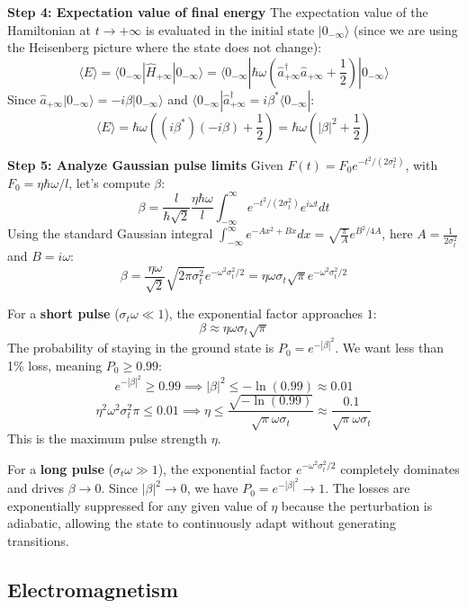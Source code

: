 \begin{solution}
\textbf{Step 4: Expectation value of final energy}
The expectation value of the Hamiltonian at $t \to +\infty$ is evaluated in the initial state $|0_{-\infty}\rangle$ (since we are using the Heisenberg picture where the state does not change):
\[ \langle E \rangle = \langle 0_{-\infty} | \hat{H}_{+\infty} | 0_{-\infty} \rangle = \langle 0_{-\infty} | \hbar\omega\left(\hat{a}_{+\infty}^\dagger \hat{a}_{+\infty} + \frac{1}{2}\right) | 0_{-\infty} \rangle \]
Since $\hat{a}_{+\infty}|0_{-\infty}\rangle = -i\beta|0_{-\infty}\rangle$ and $\langle 0_{-\infty}|\hat{a}_{+\infty}^\dagger = i\beta^*\langle 0_{-\infty}|$:
\[ \langle E \rangle = \hbar\omega \left( (i\beta^*)(-i\beta) + \frac{1}{2} \right) = \hbar\omega \left( |\beta|^2 + \frac{1}{2} \right) \]

\textbf{Step 5: Analyze Gaussian pulse limits}
Given $F(t) = F_0 e^{-t^2 / (2\sigma_t^2)}$, with $F_0 = \eta \hbar\omega / l$, let's compute $\beta$:
\[ \beta = \frac{l}{\hbar\sqrt{2}} \frac{\eta \hbar\omega}{l} \int_{-\infty}^{\infty} e^{-t^2 / (2\sigma_t^2)} e^{i\omega t} dt \]
Using the standard Gaussian integral $\int_{-\infty}^{\infty} e^{-Ax^2 + Bx} dx = \sqrt{\frac{\pi}{A}} e^{B^2 / 4A}$, here $A = \frac{1}{2\sigma_t^2}$ and $B = i\omega$:
\[ \beta = \frac{\eta\omega}{\sqrt{2}} \sqrt{2\pi\sigma_t^2} e^{-\omega^2 \sigma_t^2 / 2} = \eta \omega \sigma_t \sqrt{\pi} e^{-\omega^2 \sigma_t^2 / 2} \]

For a \textbf{short pulse} ($\sigma_t\omega \ll 1$), the exponential factor approaches $1$:
\[ \beta \approx \eta \omega \sigma_t \sqrt{\pi} \]
The probability of staying in the ground state is $P_0 = e^{-|\beta|^2}$. We want less than 1\% loss, meaning $P_0 \geq 0.99$:
\[ e^{-|\beta|^2} \geq 0.99 \implies |\beta|^2 \leq -\ln(0.99) \approx 0.01 \]
\[ \eta^2 \omega^2 \sigma_t^2 \pi \leq 0.01 \implies \eta \leq \frac{\sqrt{-\ln(0.99)}}{\sqrt{\pi} \omega \sigma_t} \approx \frac{0.1}{\sqrt{\pi} \omega \sigma_t} \]
This is the maximum pulse strength $\eta$.

For a \textbf{long pulse} ($\sigma_t\omega \gg 1$), the exponential factor $e^{-\omega^2 \sigma_t^2 / 2}$ completely dominates and drives $\beta \to 0$.
Since $|\beta|^2 \to 0$, we have $P_0 = e^{-|\beta|^2} \to 1$. The losses are exponentially suppressed for any given value of $\eta$ because the perturbation is adiabatic, allowing the state to continuously adapt without generating transitions.
\end{solution}

\subsection{Electromagnetism}

